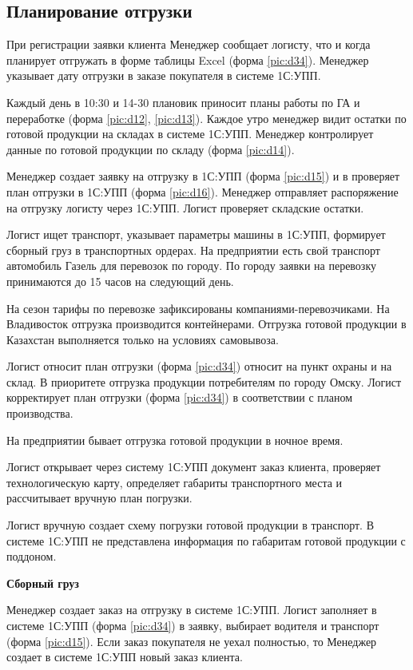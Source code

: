 \subsection{Планирование отгрузки}
\label{bp:ShipmentPlanning}

При регистрации заявки клиента Менеджер сообщает логисту, что и когда планирует отгружать в форме таблицы Excel (форма \ref{pic:d34}).
Менеджер указывает дату отгрузки в заказе покупателя в системе 1С:УПП.

Каждый день в 10:30 и 14-30 плановик приносит планы работы по ГА и переработке (форма \ref{pic:d12}, \ref{pic:d13}). 
Каждое утро менеджер видит остатки по готовой продукции на складах в системе 1С:УПП.
Менеджер контролирует данные по готовой продукции по складу (форма \ref{pic:d14}).

Менеджер создает заявку на отгрузку в 1С:УПП (форма \ref{pic:d15}) и в проверяет план отгрузки в 1С:УПП (форма \ref{pic:d16}).
Менеджер отправляет распоряжение на отгрузку логисту через 1С:УПП. Логист проверяет складские остатки.

Логист ищет транспорт, указывает параметры машины в 1С:УПП,  формирует сборный груз в транспортных ордерах.
На предприятии есть свой транспорт автомобиль Газель для перевозок по городу.
По городу заявки на перевозку принимаются до 15 часов на следующий день.

На сезон тарифы по перевозке зафиксированы компаниями-перевозчиками. На Владивосток отгрузка производится контейнерами. Отгрузка готовой продукции в Казахстан выполняется только на условиях самовывоза.

Логист относит план отгрузки (форма \ref{pic:d34}) относит на пункт охраны и на склад.
В приоритете отгрузка продукции потребителям по городу Омску.
Логист корректирует план отгрузки (форма \ref{pic:d34}) в соответствии с планом производства.

На предприятии бывает отгрузка готовой продукции в ночное время.

Логист открывает через систему 1С:УПП документ  заказ клиента, проверяет технологическую карту, определяет  габариты транспортного места и рассчитывает вручную план погрузки.

Логист вручную создает схему погрузки готовой продукции в транспорт. 
В системе 1С:УПП не представлена информация по габаритам готовой продукции с поддоном.


\textbf{Сборный груз}

Менеджер  создает заказ на отгрузку в системе 1С:УПП. Логист заполняет в системе 1С:УПП (форма \ref{pic:d34}) в заявку, выбирает водителя и транспорт (форма \ref{pic:d15}).
Если заказ покупателя не уехал полностью, то Менеджер создает в системе 1С:УПП новый заказ клиента.

